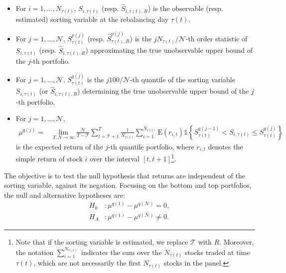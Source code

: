 \begin{itemize}
\item For $i = 1,\ldots, N_{\tau(t)}$, $S_{i,\tau(t)}$ (resp. $\widehat{S}_{i,\tau(t),R}$) is the observable (resp. estimated) sorting variable at the rebalancing day $\tau(t)$.

\item For $j=1,\ldots,\mathcal{N}$, $S_{\tau(t)}^{p(j)}$ (resp. $\widehat{S}_{\tau(t),R}^{p(j)}$) is the $jN_{\tau(t)}/\mathcal{N}$-th order statistic of $S_{i,\tau(t)}$ (resp. $\widehat{S}_{i,\tau(t),R}$) approximating the true unobservable upper bound of the $j$-th portfolio.

\item For $j=1,\ldots,\mathcal{N}$, $S_{\tau(t)}^{q(j)}$ is the $j100/\mathcal{N}$-th quantile of the sorting variable $S_{i,\tau(t)}$ (or $\widehat{S}_{i,\tau(t),R}$) determining the true unobservable upper bound of the $j$-th portfolio. 

\item For $j=1,\ldots, \mathcal{N}$,
\begin{align*}
    \mu^{q(j)} =& \lim_{T,N\rightarrow \infty }\frac{\mathcal{N}}{T-\mathcal{T}} \sum_{t=\mathcal{T}+1}^{T} \frac{1}{N_{\tau(t)}} \sum_{i=1}^{N_{\tau(t)}} \mathrm{E}\left( r_{i,t} \right) \mathds{1} \left\{ S_{\tau(t) }^{q(j-1)}<S_{i,\tau(t) }\leq S_{\tau(t) }^{q(j)}\right\} 
\end{align*}
is the expected return of the $j$-th quantile portfolio, where $r_{i,t}$ denotes the simple return of stock $i$ over the interval $[t, t+1]$\footnote{Note that if the sorting variable is estimated, we replace $\mathcal{T}$ with $R$. Moreover, the notation $\sum_{i=1}^{N_{\tau(t)}}$ indicates the sum over the $N_{\tau(t)}$ stocks traded at time $\tau(t)$, which are not necessarily the first $N_{\tau(t)}$ stocks in the panel.}.
\end{itemize}
The objective is to test the null hypothesis that returns are independent of the sorting variable, against its negation. Focusing on the bottom and top portfolios, the null and alternative hypotheses are:
\begin{align}
    H_{0} &:\mu^{q(1)}-\mu ^{q(\mathcal{N})}=0,  \label{H0} \\
    H_{A} &:\mu^{q(1)}-\mu^{q(\mathcal{N})}\neq 0.  \label{HA}
\end{align}



